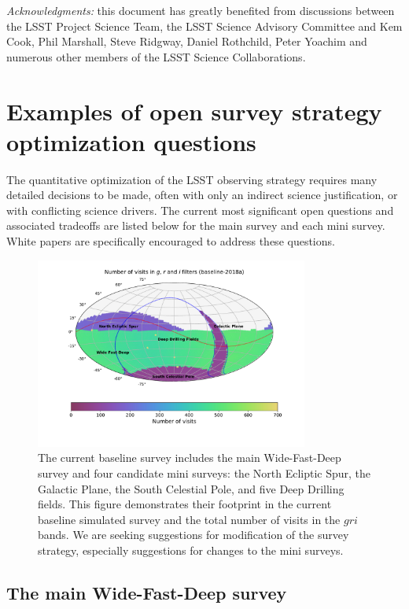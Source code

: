 \documentclass[DM,lsstdraft,toc,usenatbib]{lsstdoc}
\begin{document}
\vskip 0.2in 
{\it Acknowledgments:} this document has greatly benefited from discussions between 
the LSST Project Science Team, the LSST Science Advisory Committee and Kem Cook, 
Phil Marshall, Steve Ridgway, Daniel Rothchild, Peter Yoachim and numerous other members 
of the LSST Science Collaborations. 

\newpage
\appendix
\section{Examples of open survey strategy optimization questions \label{sec:optimization}} 

The quantitative optimization of the LSST observing strategy requires many 
detailed decisions to be made, often with only an indirect science justification,
or with conflicting science drivers.  The current most significant open questions and associated 
tradeoffs are listed below for the main survey and each mini survey. White papers are specifically 
encouraged to address these questions.

\begin{figure}[htb]
\centering
\includegraphics[width=0.8\textwidth]{Nvisits_gri}
\caption{The current baseline survey includes the main Wide-Fast-Deep survey and four candidate mini surveys:
the North Ecliptic Spur, the Galactic Plane, the South Celestial Pole, and five Deep Drilling fields. This figure
demonstrates their footprint in the current baseline simulated survey and the total number of visits in the $gri$ bands.
We are seeking suggestions for modification of the survey strategy, especially suggestions for changes to the
mini surveys.}
\end{figure}

\subsection{The main Wide-Fast-Deep survey} 
\end{document}
